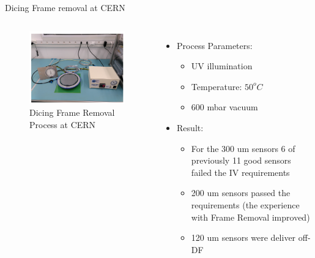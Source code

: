 \documentclass{beamer}
\begin{document}
\begin{frame}{Dicing Frame removal at CERN}
  \begin{columns}
    \begin{figure}
      \includegraphics[width=1.0\textwidth]{plots/DF_removal_Picture.png}
      \caption{Dicing Frame Removal Process at CERN}
    \end{figure}

    \begin{itemize}
      \item Process Parameters:
      \begin{itemize}
        \item UV illumination
        \item Temperature: $50  ^oC$
        \item 600 mbar vacuum
      \end{itemize}
      \item Result:
      \begin{itemize}
        \item For the 300 um sensors 6 of previously 11 good sensors failed the IV requirements
        \item 200 um sensors passed the requirements (the experience with Frame Removal improved)
        \item 120 um sensors were deliver off-DF
      \end{itemize}
    \end{itemize}

\end{columns}

\begin{figure}
\end{figure} 
  \href{https://indico.cern.ch/event/1085830/contributions/4565314/attachments/2344490/3998306/IVCV_recent_HGCal_prototype_sensors_Readiness_Review.pdf}{}
\end{frame}
\end{document}

